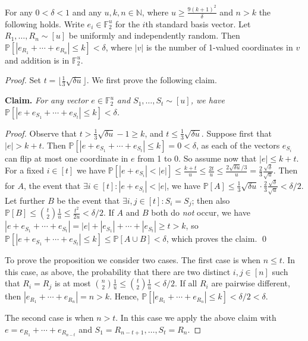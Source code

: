 \documentclass{theoretics}
\renewcommand{\Pr}[1]{\bP \left[ #1 \right]} %
\newcommand{\bF}{\ensuremath{\mathbb{F}}}
\newcommand{\bN}{\ensuremath{\mathbb{N}}}
\newcommand{\bP}{\ensuremath{\mathbb{P}}}
\begin{document}
\begin{proposition}
	\label{prop:hamming distance}
	For any $0 < \delta < 1$ and
	any $u,k,n \in \bN$, where $u \ge \frac{9(k+1)^2}{\delta}$
	and $n > k$ the following holds.  Write $e_i \in \bF_2^u$ for the $i$th standard basis vector. 
	Let $R_1,
	\dotsc, R_n \sim [u]$ be uniformly and independently random.  
	Then $\Pr{|e_{R_1} + \dotsm + e_{R_n}| \leq k} < \delta$, 
	where $|v|$ is the number of 1-valued coordinates in $v$ and addition is in $\bF_2^u$.
\end{proposition}
\begin{proof}
	Set $t = \lfloor \frac{1}{3} \sqrt{\delta u} \rfloor$. We first prove the following claim.
	
	\smallskip
	\noindent
	\textbf{Claim.}
	\textit{For any vector $e\in \bF_2^u$
	and $S_1, \ldots, S_t \sim [u]$, we have
	$\Pr{|e + e_{S_1} + \dotsm + e_{S_t}| \leq k} < \delta$.}
	
	\smallskip
	\noindent
	\textit{Proof.} Observe that $t > \frac{1}{3} \sqrt{\delta u} -1 \ge k$, and $t\le \frac{1}{3} \sqrt{\delta u}$.
	Suppose first that $|e| > k + t$. Then $\Pr{|e + e_{S_1} + \dotsm + e_{S_t}| \leq k}  = 0 < \delta$,
	as each of the vectors $e_{S_i}$ can flip at most one coordinate in $e$ from 1 to 0.
	So assume now that $|e| \leq k + t$. For a fixed $i \in [t]$ we have
	$\Pr{|e + e_{S_i}| < |e|} \leq \frac{k + t}{u} \le \frac{2t}u \le \frac{2\sqrt{\delta u}/3}{u} = \frac23\frac{\sqrt{\delta}}{\sqrt{u}}$.
	Then for $A$, the event that $\exists i \in [t] : |e + e_{S_i}| < |e|$, we have $\Pr{A} \leq  
	\frac{1}{3}\sqrt{\delta u} \cdot \frac23\frac{\sqrt{\delta}}{\sqrt{u}} < \delta/2$.
	Let further $B$ be the event that $\exists i,j \in [t] : S_i=S_j$; then also 
	$\Pr{B} \le \binom t2 \frac{1}{u} \leq \frac{t^2}{2u} < \delta/2$.
	If $A$ and $B$ both do \emph{not} occur, we have 
	$|e + e_{S_1} + \dotsm + e_{S_t}| = |e| + |e_{S_1}| + \dotsm + |e_{S_t}| \ge t>k$,
	so $\Pr{|e + e_{S_1} + \dotsm + e_{S_t}| \leq k} \le \Pr{A\cup B} < \delta$,
	which proves the claim. \qed
	
	\medskip
	\noindent
	To prove the proposition we consider two cases. The first case is when $n \le t$.
	In this case, as above, the probability that there are two distinct $i,j \in [n]$ such
	that $R_i=R_j$ is at most $\binom n2\frac{1}{u} \le \binom{t}{2}\frac{1}{u} < \delta/2$.
	If all $R_i$ are pairwise different, then $|e_{R_1} + \dotsm + e_{R_n}| = n > k$. 
	Hence, $\Pr{|e_{R_1} + \dotsm + e_{R_n}| \leq k} < \delta/2 < \delta$.
	
	The second case is when $n > t$. In this case we apply the above claim with
	$e = e_{R_{1}} + \cdots + e_{R_{n-t}}$ and $S_1 = R_{n-t+1}, \ldots, S_t = R_n$.
\end{proof}
\end{document}
